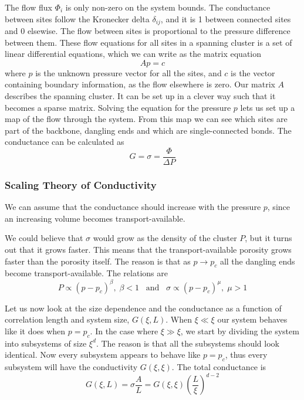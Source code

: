 \documentclass[11pt]{article}
\numberwithin{equation}{section}
\numberwithin{figure}{section}
\begin{document}
The flow flux $\Phi_i$ is only non-zero on the system bounds.
The conductance between sites follow the Kronecker delta 
$\delta_{ij}$, and it is 1 between connected sites and 0 elsewise.
The flow between sites is proportional to the pressure difference
between them. These flow equations for all sites in a spanning 
cluster is a set of linear differential equations,
which we can write as the matrix equation
\begin{equation}
    Ap = c
\end{equation}
where $p$ is the unknown pressure vector for all the sites,
and $c$ is the vector containing boundary information,
as the flow elsewhere is zero.
Our matrix $A$ describes the spanning cluster.
It can be set up in a clever way such that it becomes a sparse
matrix.
Solving the equation for the pressure $p$ lets us
set up a map of the flow through the system.
From this map we can see which sites are part of
the backbone, dangling ends and which are single-connected bonds.
The conductance can be calculated as
\begin{equation}
    G = \sigma = \frac{\Phi}{\Delta P}
\end{equation}

\subsubsection{Scaling Theory of Conductivity}
We can assume that the conductance should increase with the
pressure $p$, since an increasing volume becomes 
transport-available.

We could believe that $\sigma$ would grow as
the density of the cluster $P$, but it turns out
that it grows faster. This means that the transport-available
porosity grows faster than the porosity itself. 
The reason is that as $p\rightarrow p_c$ all the
dangling ends become transport-available. 
The relations are
\begin{equation}
    P\propto{(p-p_c)}^\beta,\;\beta < 1\;\;\;
    \text{and}\;\;\;
    \sigma\propto{(p-p_c)}^\mu,\;\mu > 1
\end{equation}

Let us now look at the size dependence and
the conductance as a function of correlation length
and system size, $G(\xi, L)$.
When $\xi \ll \xi$ our system behaves like it does when $p=p_c$.
In the case where $\xi \gg \xi$, we start by dividing the
system into subsystems of size $\xi^d$. The reason is
that all the subsystems should look identical.
Now every subsystem appears to behave like $p=p_c$,
thus every subsystem will have the conductivity $G(\xi,\xi)$.
The total conductance is
\begin{equation}
    G(\xi, L) = \sigma\frac{A}{L}= G(\xi,\xi)
    {\left(\frac{L}{\xi}\right)}^{d-2}
\end{equation}
\end{document}
